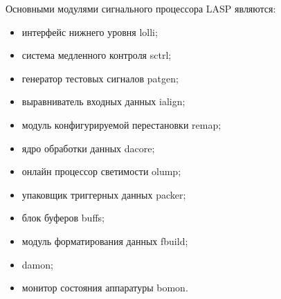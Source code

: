 Основными модулями сигнального процессора LASP являются:\par
\begin{itemize}
    \item интерфейс нижнего уровня lolli;
    \item система медленного контроля sctrl;
    \item генератор тестовых сигналов patgen;
    \item выравниватель входных данных ialign;
    \item модуль конфигурируемой перестановки remap;
    \item ядро обработки данных dacore;
    \item онлайн процессор светимости olump;
    \item упаковщик триггерных данных packer;
    \item блок буферов buffs;
    \item модуль форматирования данных fbuild;
    \item damon;
    \item монитор состояния аппаратуры bomon.
\end{itemize}\par

